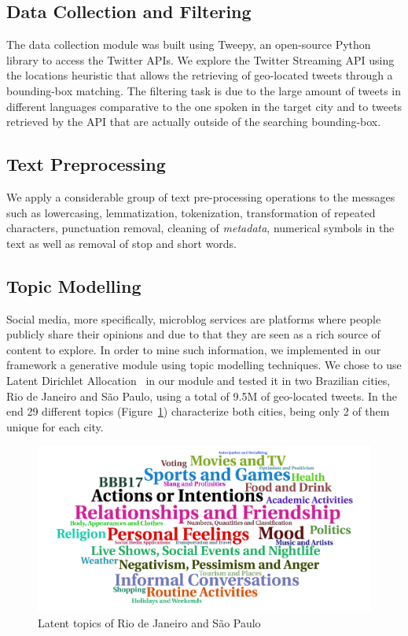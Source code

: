 \documentclass[9pt,a4paper]{extarticle}
\begin{document}
\begin{multicols}{2}
\subsection{Data Collection and Filtering}
The data collection module was built using Tweepy, an open-source Python library to access the Twitter APIs. We explore the Twitter Streaming API using the locations heuristic that allows the retrieving of geo-located tweets through a bounding-box matching. The filtering task is due to the large amount of tweets in different languages comparative to the one spoken in the target city and to tweets retrieved by the API that are actually outside of the searching bounding-box.

\subsection{Text Preprocessing}
We apply a considerable group of text pre-processing operations to the messages such as lowercasing, lemmatization, tokenization, transformation of repeated characters, punctuation removal, cleaning of \textit{metadata}, numerical symbols in the text as well as removal of stop and short words.

\subsection{Topic Modelling}
Social media, more specifically, microblog services are platforms where people publicly share their opinions and due to that they are seen as a rich source of content to explore. In order to mine such information, we implemented in our framework a generative module using topic modelling techniques. We chose to use Latent Dirichlet Allocation~\cite{blei2003latent} in our module and tested it in two Brazilian cities, Rio de Janeiro and São Paulo, using a total of 9.5M of geo-located tweets. In the end 29 different topics (Figure~\ref{fig:topics}) characterize both cities, being only 2 of them unique for each city.

\begin{figure}[H]
	\centerline{\includegraphics[scale=.2]{topics.png}}
	\caption{Latent topics of Rio de Janeiro and São Paulo}  
	\label{fig:topics}
\end{figure}


\end{multicols}
\end{document}
